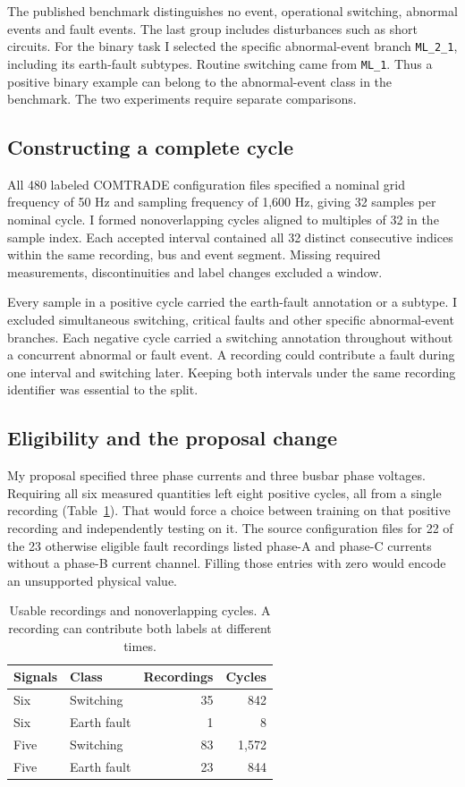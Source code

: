 \documentclass[11pt,conference,letterpaper]{IEEEtran}
\begin{document}
The published benchmark distinguishes no event, operational switching, abnormal events and fault events. The last group includes disturbances such as short circuits. For the binary task I selected the specific abnormal-event branch \texttt{ML\_2\_1}, including its earth-fault subtypes. Routine switching came from \texttt{ML\_1}. Thus a positive binary example can belong to the abnormal-event class in the benchmark. The two experiments require separate comparisons.

\subsection{Constructing a complete cycle}
All 480 labeled COMTRADE configuration files specified a nominal grid frequency of 50 Hz and sampling frequency of 1,600 Hz, giving 32 samples per nominal cycle. I formed nonoverlapping cycles aligned to multiples of 32 in the sample index. Each accepted interval contained all 32 distinct consecutive indices within the same recording, bus and event segment. Missing required measurements, discontinuities and label changes excluded a window.

Every sample in a positive cycle carried the earth-fault annotation or a subtype. I excluded simultaneous switching, critical faults and other specific abnormal-event branches. Each negative cycle carried a switching annotation throughout without a concurrent abnormal or fault event. A recording could contribute a fault during one interval and switching later. Keeping both intervals under the same recording identifier was essential to the split.

\subsection{Eligibility and the proposal change}
My proposal specified three phase currents and three busbar phase voltages. Requiring all six measured quantities left eight positive cycles, all from a single recording (Table~\ref{tab:audit}). That would force a choice between training on that positive recording and independently testing on it. The source configuration files for 22 of the 23 otherwise eligible fault recordings listed phase-A and phase-C currents without a phase-B current channel. Filling those entries with zero would encode an unsupported physical value.
\begin{table}[t]\centering\caption{Usable recordings and nonoverlapping cycles. A recording can contribute both labels at different times.}\label{tab:audit}
\begin{tabular}{llrr}\toprule Signals & Class & Recordings & Cycles\\\midrule
Six & Switching &35&842\\ Six & Earth fault &1&8\\
Five & Switching &83&1,572\\ Five & Earth fault &23&844\\\bottomrule\end{tabular}\end{table}
\end{document}
